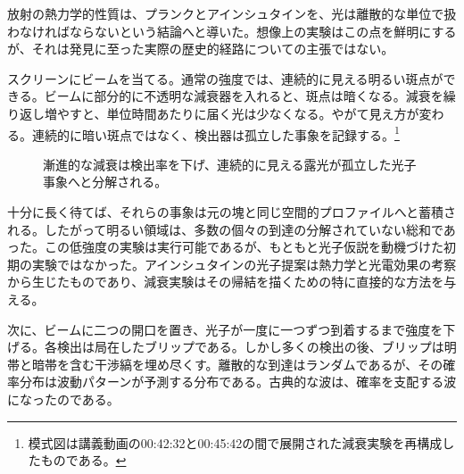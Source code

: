 放射の熱力学的性質は、プランクとアインシュタインを、光は離散的な単位で扱わなければならないという結論へと導いた。想像上の実験はこの点を鮮明にするが、それは発見に至った実際の歴史的経路についての主張ではない。

スクリーンにビームを当てる。通常の強度では、連続的に見える明るい斑点ができる。ビームに部分的に不透明な減衰器を入れると、斑点は暗くなる。減衰を繰り返し増やすと、単位時間あたりに届く光は少なくなる。やがて見え方が変わる。連続的に暗い斑点ではなく、検出器は孤立した事象を記録する。\footnote{模式図は講義動画の00:42:32と00:45:42の間で展開された減衰実験を再構成したものである。}

\begin{figure}[h]
\centering
{}
\caption{漸進的な減衰は検出率を下げ、連続的に見える露光が孤立した光子事象へと分解される。}
\end{figure}

十分に長く待てば、それらの事象は元の塊と同じ空間的プロファイルへと蓄積される。したがって明るい領域は、多数の個々の到達の分解されていない総和であった。この低強度の実験は実行可能であるが、もともと光子仮説を動機づけた初期の実験ではなかった。アインシュタインの光子提案は熱力学と光電効果の考察から生じたものであり、減衰実験はその帰結を描くための特に直接的な方法を与える。

次に、ビームに二つの開口を置き、光子が一度に一つずつ到着するまで強度を下げる。各検出は局在したブリップである。しかし多くの検出の後、ブリップは明帯と暗帯を含む干渉縞を埋め尽くす。離散的な到達はランダムであるが、その確率分布は波動パターンが予測する分布である。古典的な波は、確率を支配する波になったのである。

